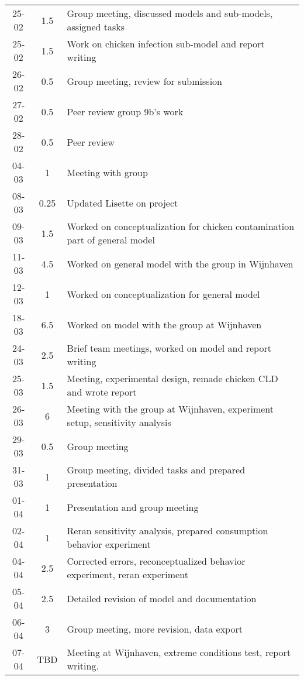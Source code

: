 \begin{longtable}[c]{c|c|m{35em}}
25-02   &   1.5     &   Group meeting, discussed models and sub-models, assigned tasks              \\
25-02   &   1.5     &   Work on chicken infection sub-model and report writing                      \\
26-02   &   0.5     &   Group meeting, review for submission                                        \\
27-02   &   0.5     &   Peer review group 9b's work                                                 \\
28-02   &   0.5     &   Peer review                                                                 \\
04-03   &   1       &   Meeting with group                                                          \\
08-03   &   0.25    &   Updated Lisette on project                                                  \\
09-03   &   1.5     &   Worked on conceptualization for chicken contamination part of general model \\
11-03   &   4.5     &   Worked on general model with the group in Wijnhaven                         \\
12-03   &   1       &   Worked on conceptualization for general model                               \\
18-03   &   6.5     &   Worked on model with the group at Wijnhaven                                 \\
24-03   &   2.5     &   Brief team meetings, worked on model and report writing                     \\
25-03   &   1.5     &   Meeting, experimental design, remade chicken CLD and wrote report           \\
26-03   &   6       &   Meeting with the group at Wijnhaven, experiment setup, sensitivity analysis \\
29-03   &   0.5     &   Group meeting                                                               \\
31-03   &   1       &   Group meeting, divided tasks and prepared presentation                      \\
01-04   &   1       &   Presentation and group meeting                                              \\
02-04   &   1       &   Reran sensitivity analysis, prepared consumption behavior experiment        \\
04-04   &   2.5     &   Corrected errors, reconceptualized behavior experiment, reran experiment    \\
05-04   &   2.5     &   Detailed revision of model and documentation                                \\
06-04   &   3       &   Group meeting, more revision, data export                                   \\
07-04   &   TBD     &   Meeting at Wijnhaven, extreme conditions test, report writing.                \\



\end{longtable}

